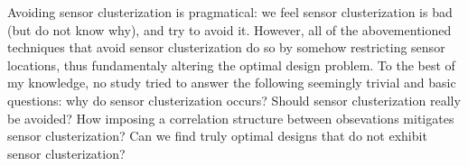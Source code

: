Avoiding sensor clusterization is pragmatical: we feel sensor
clusterization is bad (but do not know why), and try to avoid
it. However, all of the abovementioned techniques that avoid sensor
clusterization do so by somehow restricting sensor locations, thus
fundamentaly altering the optimal design problem. To the best of my
knowledge, no study tried to answer the following seemingly trivial
and basic questions: why do sensor clusterization occurs? Should
sensor clusterization really be avoided? How imposing a correlation
structure between obsevations mitigates sensor clusterization? Can we
find truly optimal designs that do not exhibit sensor clusterization?









